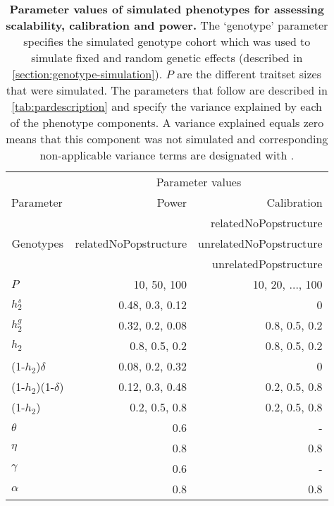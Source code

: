 \begin{table}[htbp]
  \centering
  \caption[\textbf{Parameter values of simulated phenotypes for assessing scalability, calibration and power.}]{\textbf{Parameter values of simulated phenotypes for assessing scalability, calibration and power.} The `genotype' parameter specifies the simulated genotype cohort which was used to simulate fixed and random genetic effects (described in \cref{section:genotype-simulation}). \(P\) are the different traitset sizes that were simulated. The parameters that follow are described in \cref{tab:pardescription} and specify the variance explained by each of the phenotype components. A variance explained equals zero means that this component was not simulated and corresponding non-applicable variance terms are designated with \textquote{-}.} 
    \begin{tabular}{lrr}
    \toprule
          & \multicolumn{2}{c}{Parameter values} \\
\cmidrule{2-3}    Parameter & Power  & Calibration \\
    \midrule
    \multicolumn{1}{c}{\multirow{3}[1]{*}{Genotypes}} & \multicolumn{1}{c}{\multirow{3}[1]{*}{relatedNoPopstructure}} & relatedNoPopstructure \\
          &       & unrelatedNoPopstructure \\
          &       & unrelatedPopstructure \\
          \addlinespace[1.5ex]
    \(P\) & 10, 50, 100 & 10, 20, \(\ldots\), 100 \\
   \addlinespace[1.5ex]
    \(h_2^s\) & 0.48, 0.3, 0.12 & 0 \\
    \(h_2^g\) & 0.32, 0.2, 0.08 & 0.8, 0.5, 0.2 \\
    \(h_2\) & 0.8, 0.5, 0.2 & 0.8, 0.5, 0.2 \\
    (1-\(h_2\))\(\delta\) & 0.08, 0.2, 0.32 & 0 \\
    (1-\(h_2\))(1-\(\delta\)) & 0.12, 0.3, 0.48 & 0.2, 0.5, 0.8 \\
    (1-\(h_2\)) & 0.2, 0.5, 0.8 & 0.2, 0.5, 0.8 \\
    \(\theta\) & 0.6   &  - \\
    \(\eta\) & 0.8   & 0.8 \\
    \(\gamma\) & 0.6   &  - \\
    \(\alpha\) & 0.8   & 0.8 \\
    \bottomrule
    \end{tabular}%
\label{tab:parvalues}%
\end{table}%
%

